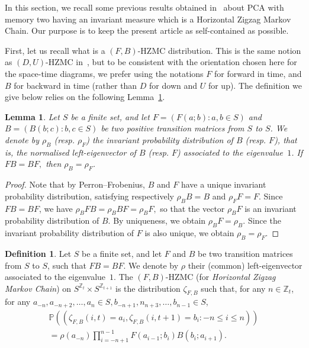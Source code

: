 \documentclass[10pt]{amsart}
\newtheorem{lemm}[theo]{Lemma}\newtheorem{prop}[theo]{Proposition}\newtheorem{coro}[theo]{Corollary}\newtheorem{conj}[theo]{Conjecture}
\theoremstyle{definition}\newtheorem{defi}[theo]{Definition}\newtheorem{rema}[theo]{Remark}\newtheorem{exam}[theo]{Example}\newtheorem{exem}[theo]{Example}\newtheorem{nota}[theo]{Notation}
\newcounter{a}
\newcommand{\ZZ}{\mathbb{Z}}
\newcommand{\Pbb}{\mathbb{P}}
\begin{document}
In this section, we recall some previous results obtained in~\cite{Casse17} about PCA with memory two having an invariant measure which is a Horizontal Zigzag Markov Chain. Our purpose is to keep the present article as self-contained as possible.

First, let us recall what is a $(F,B)$-HZMC distribution. This is the same notion as $(D,U)$-HZMC in~\cite{Casse17}, but to be consistent with the orientation chosen here for the space-time diagrams, we prefer using the notations $F$ for forward in time, and $B$ for backward in time (rather than $D$ for down and $U$ for up). The definition we give below relies on the following Lemma~\ref{lemm5.1}.

\begin{lemm}\label{lemm5.1}
Let $S$ be a finite set, and let $F = (F(a;b) : a,b \in S)$ and $B = (B(b;c) : b,c \in S)$ be two positive transition matrices from $S$ to $S$. We denote by $\rho_B$ (resp. $\rho_F$) the invariant probability distribution of $B$ (resp. $F$), that is, the normalised left-eigenvector of $B$ (resp. $F$) associated to the eigenvalue~$1$. If $FB=BF,$ then $\rho_B=\rho_F$.
\end{lemm}

\begin{proof}
Note that by Perron--Frobenius, $B$ and $F$ have a unique invariant probability distribution, satisfying respectively $\rho_BB=B$ and $\rho_F F=F$. Since $FB=BF$, we have $ \rho_B FB = \rho_B B F = \rho_B F,$ so that the vector $\rho_B F$ is an invariant probability distribution of $B$. By uniqueness, we obtain $\rho_B F = \rho_B$. Since the invariant probability distribution of $F$ is also unique, we obtain $\rho_B=\rho_F$.
\end{proof}

\begin{defi}\label{def:hzmc}
Let $S$ be a finite set, and let $F$ and $B$ be two transition matrices from $S$ to $S$, such that $FB=BF$. We denote by $\rho$ their (common) left-eigenvector associated to the eigenvalue~$1$. The $(F,B)$-HZMC (for \emph{Horizontal Zigzag Markov Chain}) on $S^{\ZZ_{t}} \times S^{\ZZ_{t+1}}$ is the distribution $\zeta_{F,B}$ such that, for any $n \in \ZZ_t$, for any $a_{-n},a_{-n+2},\ldots,a_n \in S, b_{-n+1},n_{n+3},\ldots,b_{n-1} \in S$,
\begin{multline*}
\Pbb\left((\zeta_{F,B}(i,t)= a_i, \zeta_{F,B}(i,t+1) = b_i :-n\leq i\leq n)\right) \\
 = \rho(a_{-n}) \prod_{i=-n+1}^{n-1} F(a_{i-1};b_i) B(b_i;a_{i+1}).
\end{multline*}
\end{defi}
\end{document}

